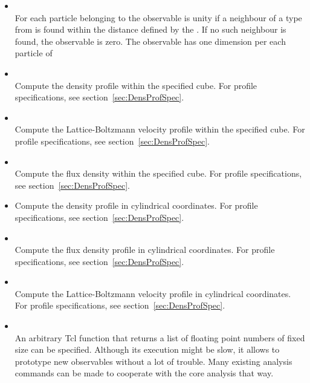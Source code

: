 \begin{itemize}
    \item {}    \\
          For each particle belonging to  
          the observable is unity if a neighbour of a type from 
           is found within the distance 
          defined by the . If no such neighbour is found, the 
          observable is zero. The observable has one dimension per each 
          particle of 
    \item {}    \\
          Compute the density profile within the specified cube.
          For profile specifications, see section~\ref{sec:DensProfSpec}.

    \item {}    \\
          Compute the Lattice-Boltzmann velocity profile within the specified cube.
          For profile specifications, see section~\ref{sec:DensProfSpec}.

    \item {}    \\
          Compute the flux density within the specified cube.
          For profile specifications, see section~\ref{sec:DensProfSpec}.
    \item {}
        Compute the density profile in cylindrical coordinates.
          For profile specifications, see section~\ref{sec:DensProfSpec}.
    \item {} \\
        Compute the flux density profile in cylindrical coordinates.
          For profile specifications, see section~\ref{sec:DensProfSpec}.
    \item {} \\
        Compute the Lattice-Boltzmann velocity profile in cylindrical coordinates.
          For profile specifications, see section~\ref{sec:DensProfSpec}.
    \item {} \\
        An arbitrary Tcl function that returns a list of floating point numbers of fixed size
         can be specified. Although its execution might be slow, it allows 
        to prototype new observables without a lot of trouble.
        Many existing analysis commands can be made to cooperate with the core analysis that way.
  \end{itemize}

